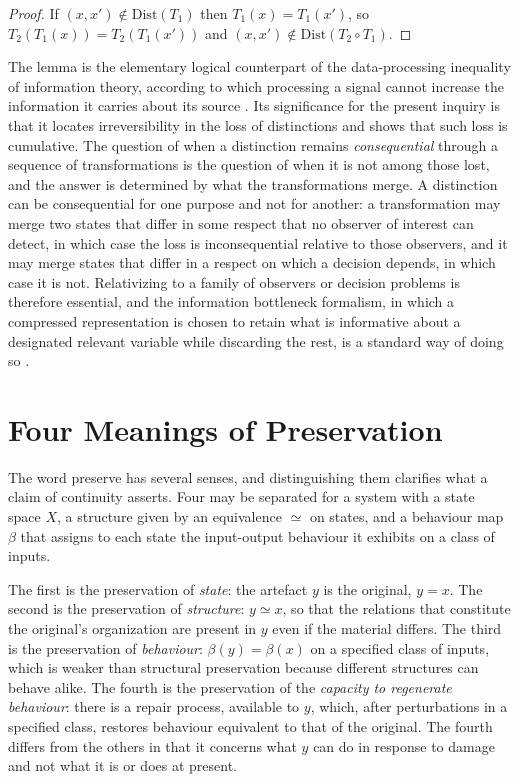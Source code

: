 \documentclass[11pt,twoside,openright]{book}
\theoremstyle{plain}
\theoremstyle{definition}
\theoremstyle{remark}
\begin{document}
\begin{proof}
If $(x,x')\notin\mathrm{Dist}(T_1)$ then $T_1(x)=T_1(x')$, so $T_2(T_1(x))=T_2(T_1(x'))$ and $(x,x')\notin\mathrm{Dist}(T_2\circ T_1)$.
\end{proof}

The lemma is the elementary logical counterpart of the data-processing inequality of information theory, according to which processing a signal cannot increase the information it carries about its source \cite{shannon1948,cover2006}. Its significance for the present inquiry is that it locates irreversibility in the loss of distinctions and shows that such loss is cumulative. The question of when a distinction remains \emph{consequential} through a sequence of transformations is the question of when it is not among those lost, and the answer is determined by what the transformations merge. A distinction can be consequential for one purpose and not for another: a transformation may merge two states that differ in some respect that no observer of interest can detect, in which case the loss is inconsequential relative to those observers, and it may merge states that differ in a respect on which a decision depends, in which case it is not. Relativizing to a family of observers or decision problems is therefore essential, and the information bottleneck formalism, in which a compressed representation is chosen to retain what is informative about a designated relevant variable while discarding the rest, is a standard way of doing so \cite{tishby1999}.

\section{Four Meanings of Preservation}

The word preserve has several senses, and distinguishing them clarifies what a claim of continuity asserts. Four may be separated for a system with a state space $X$, a structure given by an equivalence $\simeq$ on states, and a behaviour map $\beta$ that assigns to each state the input-output behaviour it exhibits on a class of inputs.

The first is the preservation of \emph{state}: the artefact $y$ is the original, $y=x$. The second is the preservation of \emph{structure}: $y\simeq x$, so that the relations that constitute the original's organization are present in $y$ even if the material differs. The third is the preservation of \emph{behaviour}: $\beta(y)=\beta(x)$ on a specified class of inputs, which is weaker than structural preservation because different structures can behave alike. The fourth is the preservation of the \emph{capacity to regenerate behaviour}: there is a repair process, available to $y$, which, after perturbations in a specified class, restores behaviour equivalent to that of the original. The fourth differs from the others in that it concerns what $y$ can do in response to damage and not what it is or does at present.
\end{document}
